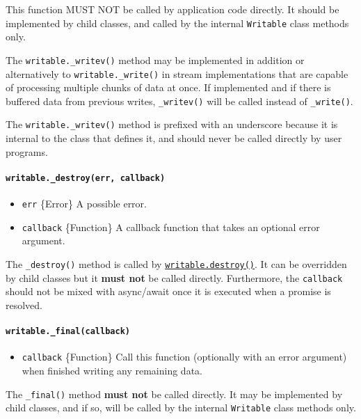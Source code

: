 This function MUST NOT be called by application code directly. It should
be implemented by child classes, and called by the internal
\texttt{Writable} class methods only.

The \texttt{writable.\_writev()} method may be implemented in addition
or alternatively to \texttt{writable.\_write()} in stream
implementations that are capable of processing multiple chunks of data
at once. If implemented and if there is buffered data from previous
writes, \texttt{\_writev()} will be called instead of
\texttt{\_write()}.

The \texttt{writable.\_writev()} method is prefixed with an underscore
because it is internal to the class that defines it, and should never be
called directly by user programs.

\paragraph{\texorpdfstring{\texttt{writable.\_destroy(err,\ callback)}}{writable.\_destroy(err, callback)}}\label{writable._destroyerr-callback}

\begin{itemize}
\tightlist
\item
  \texttt{err} \{Error\} A possible error.
\item
  \texttt{callback} \{Function\} A callback function that takes an
  optional error argument.
\end{itemize}

The \texttt{\_destroy()} method is called by
\hyperref[writabledestroyerror]{\texttt{writable.destroy()}}. It can be
overridden by child classes but it \textbf{must not} be called directly.
Furthermore, the \texttt{callback} should not be mixed with async/await
once it is executed when a promise is resolved.

\paragraph{\texorpdfstring{\texttt{writable.\_final(callback)}}{writable.\_final(callback)}}\label{writable._finalcallback}

\begin{itemize}
\tightlist
\item
  \texttt{callback} \{Function\} Call this function (optionally with an
  error argument) when finished writing any remaining data.
\end{itemize}

The \texttt{\_final()} method \textbf{must not} be called directly. It
may be implemented by child classes, and if so, will be called by the
internal \texttt{Writable} class methods only.

